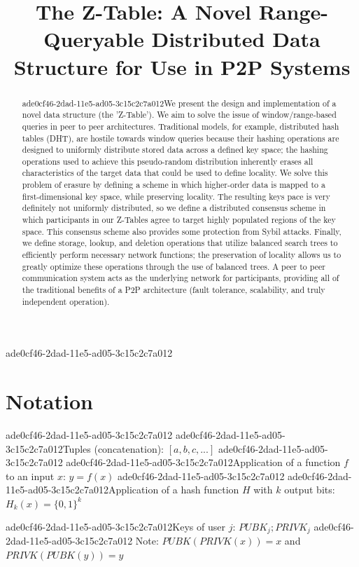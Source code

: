 \documentclass[12pt]{article}
\title{The Z-Table: A Novel Range-Queryable Distributed Data Structure for Use in P2P Systems}
\begin{document}
\maketitle
ade0cf46-2dad-11e5-ad05-3c15c2c7a012
\begin{abstract}
ade0cf46-2dad-11e5-ad05-3c15c2c7a012We present the design and implementation of a novel data structure (the 'Z-Table'). We aim to solve the issue of window/range-based queries in peer to peer architectures. Traditional models, for example,  distributed hash tables (DHT), are hostile towards window queries because their hashing operations are designed to uniformly distribute stored data across a defined key space; the hashing operations used to achieve this pseudo-random distribution inherently erases all characteristics of the target data that could be used to define locality. We solve this problem of erasure by defining a scheme in which higher-order data is mapped to a first-dimensional key space, while preserving locality. The resulting keys pace is very definitely not uniformly distributed, so we define a distributed consensus scheme in which participants in our Z-Tables agree to target highly populated regions of the key space. This consensus scheme also provides some protection from Sybil attacks. Finally, we define storage, lookup, and deletion operations that utilize balanced search trees to efficiently perform necessary network functions; the preservation of locality allows us to greatly optimize these operations through the use of balanced trees. A peer to peer communication system acts as the underlying network for participants, providing all of the traditional benefits of a P2P architecture (fault tolerance, scalability, and truly independent operation).
\end{abstract}

\section{Notation}
ade0cf46-2dad-11e5-ad05-3c15c2c7a012
ade0cf46-2dad-11e5-ad05-3c15c2c7a012Tuples (concatenation): $[a,b,c,...]$
ade0cf46-2dad-11e5-ad05-3c15c2c7a012
ade0cf46-2dad-11e5-ad05-3c15c2c7a012Application of a function $f$ to an input $x$: $y=f(x)$
ade0cf46-2dad-11e5-ad05-3c15c2c7a012
ade0cf46-2dad-11e5-ad05-3c15c2c7a012Application of a hash function $H$ with $k$ output bits: $H_{k}(x) = \{0,1\}^k$

ade0cf46-2dad-11e5-ad05-3c15c2c7a012Keys of user $j$: $ PUBK_j; PRIVK_j $
ade0cf46-2dad-11e5-ad05-3c15c2c7a012
Note: $PUBK(PRIVK(x)) = x$ and $PRIVK(PUBK(y)) = y$~
\end{document}
